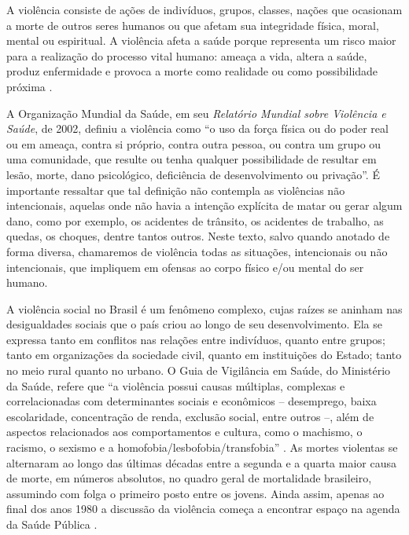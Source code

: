 
A violência consiste de ações de indivíduos, grupos, classes, nações que ocasionam a morte de outros seres humanos ou que afetam sua integridade física, moral, mental ou espiritual\citep{minayo1997violencia}. A violência afeta a saúde porque representa um risco maior para a realização do processo vital humano: ameaça a vida, altera a saúde, produz enfermidade e provoca a morte como realidade ou como possibilidade próxima \citep{franco1990violencia}.

A Organização Mundial da Saúde, em seu \textit{Relatório Mundial sobre Violência e Saúde}, de 2002, definiu a violência como “o uso da força física ou do poder real ou em ameaça, contra si próprio, contra outra pessoa, ou contra um grupo ou uma comunidade, que resulte ou tenha qualquer possibilidade de resultar em lesão, morte, dano psicológico, deficiência de desenvolvimento ou privação”\citep{organizaccao2002relatorio}. É importante ressaltar que tal definição não contempla as violências não intencionais, aquelas onde não havia a intenção explícita de matar ou gerar algum dano, como por exemplo, os acidentes de trânsito, os acidentes de trabalho, as quedas, os choques, dentre tantos outros. Neste texto, salvo quando anotado de forma diversa, chamaremos de violência todas as situações, intencionais ou não intencionais, que impliquem em ofensas ao corpo físico e/ou mental do ser humano.

A violência social no Brasil é um fenômeno complexo, cujas raízes se aninham nas desigualdades sociais que o país criou ao longo de seu desenvolvimento. Ela se expressa tanto em conflitos nas relações entre indivíduos, quanto entre grupos; tanto em organizações da sociedade civil, quanto em instituições do Estado; tanto no meio rural quanto no urbano. O Guia de Vigilância em Saúde, do Ministério da Saúde, refere que “a violência possui causas múltiplas, complexas e correlacionadas com determinantes sociais e econômicos – desemprego, baixa escolaridade, concentração de renda, exclusão social, entre outros –, além de aspectos relacionados aos comportamentos e cultura, como o machismo, o racismo, o sexismo e a homofobia/lesbofobia/transfobia” \citep{ministerio2019guia}. As mortes violentas se alternaram ao longo das últimas décadas entre a segunda e a quarta maior causa de morte, em números absolutos, no quadro geral de mortalidade brasileiro, assumindo com folga o primeiro posto entre os jovens. Ainda assim, apenas ao final dos anos 1980 a discussão da violência começa a encontrar espaço na agenda da Saúde Pública \citep{minayo1994violencia}.

